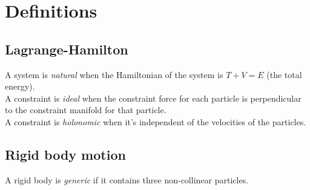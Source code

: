 \section{Definitions}
\subsection{Lagrange-Hamilton}
A system is \emph{natural} when the Hamiltonian of the system is $T+V=E$ (the total energy).\\
A constraint is \emph{ideal} when the constraint force for each particle is perpendicular to the constraint manifold for that particle. \\
A constraint is \emph{holonomic} when it's independent of the velocities of the particles.


\subsection{Rigid body motion}
A rigid body is \emph{generic} if it contains three non-collinear particles.
